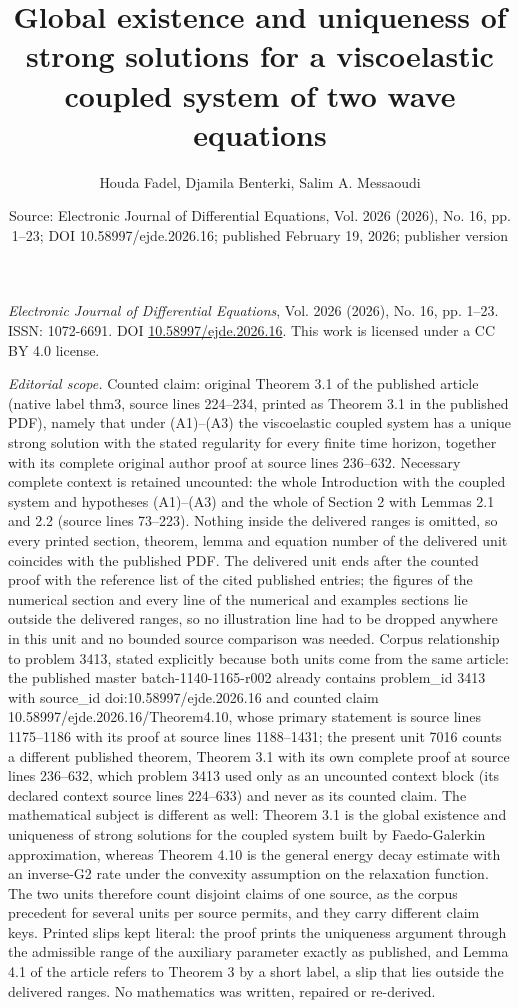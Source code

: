 \documentclass[10pt,a4paper]{amsart}
\title[Global existence and uniqueness of strong solutions for a]{Global existence and uniqueness of strong solutions for a viscoelastic coupled system of two wave equations}
\author{Houda Fadel, Djamila Benterki, Salim A. Messaoudi}
\date{Source: Electronic Journal of Differential Equations, Vol. 2026 (2026), No. 16, pp. 1--23; DOI 10.58997/ejde.2026.16; published February 19, 2026; publisher version}
\numberwithin{equation}{section}
\begin{document}
\maketitle
\noindent\emph{Electronic Journal of Differential Equations}, Vol. 2026 (2026), No. 16, pp. 1--23.\newline
ISSN: 1072-6691. DOI \href{https://doi.org/10.58997/ejde.2026.16}{10.58997/ejde.2026.16}. This work is licensed under a CC BY 4.0 license.\par\smallskip
\noindent\textit{Editorial scope.} Counted claim: original Theorem 3.1 of the published article (native label thm3, source lines 224--234, printed as Theorem 3.1 in the published PDF), namely that under (A1)--(A3) the viscoelastic coupled system has a unique strong solution with the stated regularity for every finite time horizon, together with its complete original author proof at source lines 236--632. Necessary complete context is retained uncounted: the whole Introduction with the coupled system and hypotheses (A1)--(A3) and the whole of Section 2 with Lemmas 2.1 and 2.2 (source lines 73--223). Nothing inside the delivered ranges is omitted, so every printed section, theorem, lemma and equation number of the delivered unit coincides with the published PDF. The delivered unit ends after the counted proof with the reference list of the cited published entries; the figures of the numerical section and every line of the numerical and examples sections lie outside the delivered ranges, so no illustration line had to be dropped anywhere in this unit and no bounded source comparison was needed. Corpus relationship to problem 3413, stated explicitly because both units come from the same article: the published master batch-1140-1165-r002 already contains problem\_id 3413 with source\_id doi:10.58997/ejde.2026.16 and counted claim 10.58997/ejde.2026.16/Theorem4.10, whose primary statement is source lines 1175--1186 with its proof at source lines 1188--1431; the present unit 7016 counts a different published theorem, Theorem 3.1 with its own complete proof at source lines 236--632, which problem 3413 used only as an uncounted context block (its declared context source lines 224--633) and never as its counted claim. The mathematical subject is different as well: Theorem 3.1 is the global existence and uniqueness of strong solutions for the coupled system built by Faedo-Galerkin approximation, whereas Theorem 4.10 is the general energy decay estimate with an inverse-G2 rate under the convexity assumption on the relaxation function. The two units therefore count disjoint claims of one source, as the corpus precedent for several units per source permits, and they carry different claim keys. Printed slips kept literal: the proof prints the uniqueness argument through the admissible range of the auxiliary parameter exactly as published, and Lemma 4.1 of the article refers to Theorem 3 by a short label, a slip that lies outside the delivered ranges. No mathematics was written, repaired or re-derived.
\end{document}
